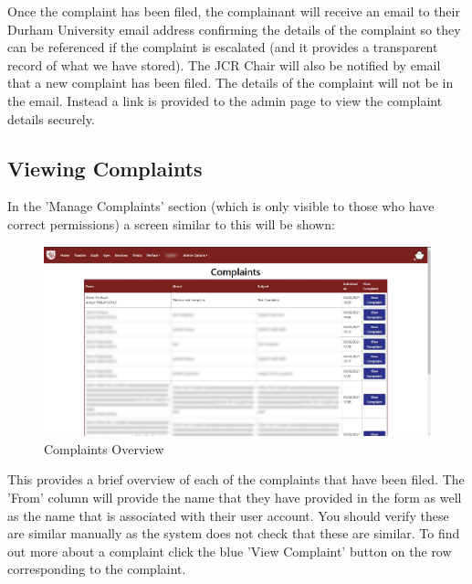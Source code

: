 \documentclass{article}
\begin{document}
Once the complaint has been filed, the complainant will receive an email to their Durham University email address confirming the details of the complaint so they can be referenced if the complaint is escalated (and it provides a transparent record of what we have stored). The JCR Chair will also be notified by email that a new complaint has been filed. The details of the complaint will not be in the email. Instead a link is provided to the admin page to view the complaint details securely.

\subsection{Viewing Complaints}
In the 'Manage Complaints' section (which is only visible to those who have correct permissions) a screen similar to this will be shown:
\begin{figure}[H]
    \centering
    \includegraphics[width=\textwidth,height=\textheight,keepaspectratio]{complaints/complaints_overview.png}
    \caption{Complaints Overview}
    \label{fig:complaints_overview}
\end{figure}
This provides a brief overview of each of the complaints that have been filed. The 'From' column will provide the name that they have provided in the form as well as the name that is associated with their user account. You should verify these are similar manually as the system does not check that these are similar. To find out more about a complaint click the blue 'View Complaint' button on the row corresponding to the complaint. 
\end{document}
